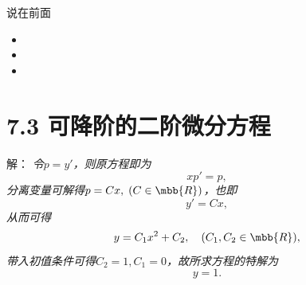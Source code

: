 
\titlepage

\begin{frame}{说在前面}
	\linespread{1.5}
	  \begin{itemize}[<+-|alert@+>]
	    \item {}
	    \item {}
	    \item {}
	  \end{itemize}
\end{frame}


\section{7.3 可降阶的二阶微分方程}

\begin{frame}
	\linespread{1.5}
	
	\bigskip
	
	\small 解：\it
	令$p=y'$，则原方程即为
	$$xp'=p,$$
	分离变量可解得$p=Cx,\;(C\in\mbb{R})$，也即
	$$y'=Cx,$$
	从而可得
	$$y=C_1x^2+C_2,\quad (C_1,C_2\in\mbb{R}),$$
	带入初值条件可得$C_2=1,C_1=0$，故所求方程的特解为
	$$y=1.$$
\end{frame}

